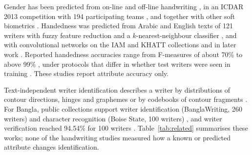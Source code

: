 \documentclass[conference]{IEEEtran}
\begin{document}
Gender has been predicted from on-line and off-line handwriting \cite{liwicki2011gender,siddiqi2015gender}, in an ICDAR 2013 competition with 194 participating teams \cite{hassaine2013icdar}, and together with other soft biometrics \cite{bouadjenek2016soft}. Handedness was predicted from Arabic and English texts of 121 writers with fuzzy feature reduction and a $k$-nearest-neighbour classifier \cite{almaadeed2016handedness}, and with convolutional networks on the IAM and KHATT collections \cite{morera2018handedness} and in later work \cite{rahmanian2021handedness}. Reported handedness accuracies range from F-measures of about 70\% \cite{almaadeed2016handedness} to above 99\% \cite{rahmanian2021handedness}, under protocols that differ in whether test writers were seen in training \cite{anon2026handedness}. These studies report attribute accuracy only.

Text-independent writer identification describes a writer by distributions of contour directions, hinges and graphemes \cite{bulacu2007text} or by codebooks of contour fragments \cite{schomaker2007codebooks}. For Bangla, public collections support writer identification (BanglaWriting, 260 writers) \cite{mridha2021banglawriting} and character recognition (Boise State, 100 writers) \cite{majid2018bangla}, and writer verification reached 94.54\% for 100 writers \cite{paul2024bangla}. Table~\ref{tab:related} summarises these works; none of the handwriting studies measured how a known or predicted attribute changes identification.
\end{document}
